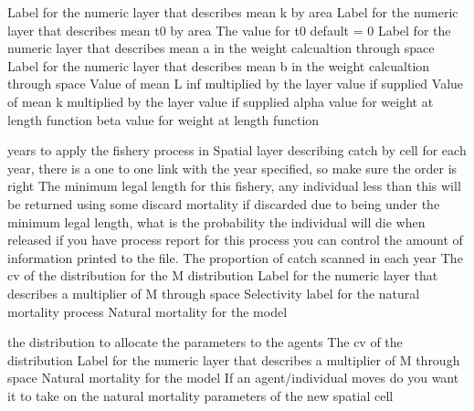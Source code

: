  {Label for the numeric layer that describes mean k by area}
 {Label for the numeric layer that describes mean t0 by area}
 {The value for t0 default = 0}
 {Label for the numeric layer that describes mean a in the weight calcualtion through space}
 {Label for the numeric layer that describes mean b in the weight calcualtion through space}
 {Value of mean L inf multiplied by the layer value if supplied}
 {Value of mean k multiplied by the layer value if supplied}
 {alpha value for weight at length function}
 {beta value for weight at length function}
 {}
 {}
\par\textbf{}\par
\par\textbf{}\par
{} {years to apply the fishery process in}
 {Spatial layer describing catch by cell for each year, there is a one to one link with the year specified, so make sure the order is right}
 {The minimum legal length for this fishery, any individual less than this will be returned using some discard mortality}
 {if discarded due to being under the minimum legal length, what is the probability the individual will die when released}
 {if you have process report for this process you can control the amount of information printed to the file.}
 {The proportion of catch scanned in each year}
 {The cv of the distribution for the M distribution}
 {Label for the numeric layer that describes a multiplier of M through space}
 {Selectivity label for the natural mortality process}
 {Natural mortality for the model}
\par\textbf{}\par
{} {the distribution to allocate the parameters to the agents}
 {The cv of the distribution}
 {Label for the numeric layer that describes a multiplier of M through space}
 {Natural mortality for the model}
 {If an agent/individual moves do you want it to take on the natural mortality parameters of the new spatial cell}
